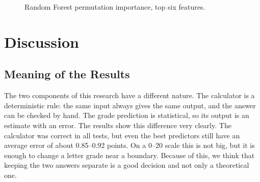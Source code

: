 \documentclass[10pt,twocolumn,a4paper]{article}
\begin{document}
\begin{figure}[t]
\centering
{}
\caption{Random Forest permutation importance, top six features.}
\label{fig:imp}
\end{figure}

\section{Discussion}
\subsection{Meaning of the Results}
The two components of this research have a different nature. The calculator is a deterministic rule: the same input always gives the same output, and the answer can be checked by hand. The grade prediction is statistical, so its output is an estimate with an error. The results show this difference very clearly. The calculator was correct in all tests, but even the best predictors still have an average error of about 0.85--0.92 points. On a 0--20 scale this is not big, but it is enough to change a letter grade near a boundary. Because of this, we think that keeping the two answers separate is a good decision and not only a theoretical one.
\end{document}
